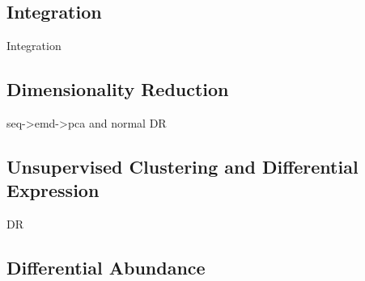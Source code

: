 \subsection*{Integration}
Integration

\subsection*{Dimensionality Reduction}
seq->emd->pca and normal DR

\subsection*{Unsupervised Clustering and Differential Expression}
DR

\subsection*{Differential Abundance}

